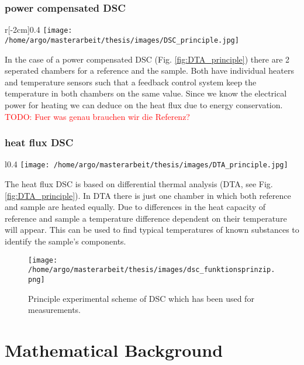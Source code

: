 \documentclass{scrartcl}[12pt, halfparskip]
\newcommand{\todo}[1]{\textcolor{red}{TODO: #1}}
\begin{document}
\subsubsection{power compensated DSC}

\begin{wrapfigure}{r}[-2cm]{0.4\textwidth}
	\texttt{[image: /home/argo/masterarbeit/thesis/images/DSC\_principle.jpg]}
	\caption{Working principle of power compensated DSC}
\end{wrapfigure}

In the case of a power compensated DSC (Fig. \ref{fig:DTA_principle}) there are 2 seperated chambers for a reference and the sample. Both have individual heaters and temperature sensors such that a feedback control system keep the temperature in both chambers on the same value. Since we know the electrical power for heating we can deduce on the heat flux due to energy conservation. \todo{Fuer was genau brauchen wir die Referenz?}




\subsubsection{heat flux DSC}

\begin{wrapfigure}{l}{0.4\textwidth}
	\texttt{[image: /home/argo/masterarbeit/thesis/images/DTA\_principle.jpg]}
	\caption{Working principle DTA}
	\label{fig:DTA_principle}
\end{wrapfigure}

The heat flux DSC is based on differential thermal analysis (DTA, see Fig. \ref{fig:DTA_principle}). In DTA there is just one chamber in which both reference and sample are heated equally. Due to differences in the heat capacity of reference and sample a temperature difference dependent on their temperature will appear. This can be used to find typical temperatures of known substances to identify the sample's components.





\begin{figure}[H]
	\centering
	\texttt{[image: /home/argo/masterarbeit/thesis/images/dsc\_funktionsprinzip.png]}
	\caption{Principle experimental scheme of DSC which has been used for measurements.}
\end{figure}


\newpage
\section{Mathematical Background}
\end{document}
